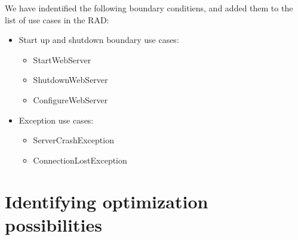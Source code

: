 We have indentified the following boundary conditiens, and added them to the list of use cases in the RAD:

\begin{itemize}
	\item Start up and shutdown boundary use cases:
	\begin{itemize}
			\item StartWebServer
			\item ShutdownWebServer
			\item ConfigureWebServer
	\end{itemize}
	\item Exception use cases:
	\begin{itemize}
			\item ServerCrashException
			\item ConnectionLostException
	\end{itemize}
\end{itemize}

\section{Identifying optimization possibilities}